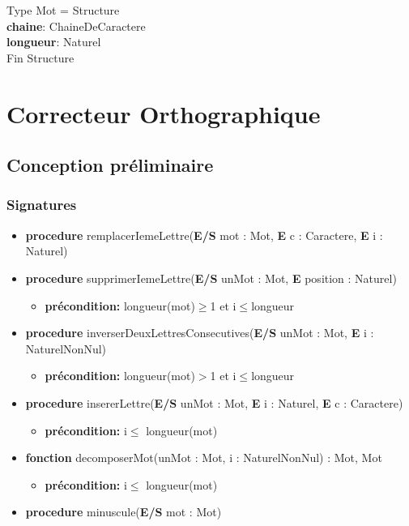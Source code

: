 \documentclass{article}
\begin{document}
    \pagestyle{empty}
    \noindent
    Type Mot = Structure \\
    \textbf{chaine}: ChaineDeCaractere \\
    \textbf{longueur}: Naturel\\
    Fin Structure

    \section*{Correcteur Orthographique}
    \subsection*{Conception préliminaire}
   
    \subsubsection*{Signatures}

	\begin{itemize}[label=$\ $, leftmargin=1cm]
		 \item \textbf{procedure} remplacerIemeLettre(\textbf{E/S} mot : Mot, \textbf{E} c : Caractere, \textbf{E} i : Naturel)
		 \item \textbf{procedure} supprimerIemeLettre(\textbf{E/S} unMot : Mot, \textbf{E} position : Naturel)
		 \begin{itemize}[label=$| $]
            \item \textbf{précondition:} longueur(mot)$\ge$1 et i$\le$longueur
         \end{itemize}
		 \item \textbf{procedure} inverserDeuxLettresConsecutives(\textbf{E/S} unMot : Mot,  \textbf{E} i : NaturelNonNul)
		 \begin{itemize}[label=$| $]
            \item \textbf{précondition:} longueur(mot)$>$1 et i$\le$longueur
         \end{itemize}
		 
		 \item \textbf{procedure} insererLettre(\textbf{E/S} unMot : Mot, \textbf{E} i : Naturel, \textbf{E} c : Caractere)
		 \begin{itemize}[label=$| $]
            \item \textbf{précondition:} i$\le$ longueur(mot)
         \end{itemize}
         \item \textbf{fonction} decomposerMot(unMot : Mot, i : NaturelNonNul) : Mot, Mot
		 \begin{itemize}[label=$| $]
            \item \textbf{précondition:} i$\le$ longueur(mot)
         \end{itemize}
         \item \textbf{procedure} minuscule(\textbf{E/S} mot : Mot)
        
	\end{itemize} 
    
\end{document}
